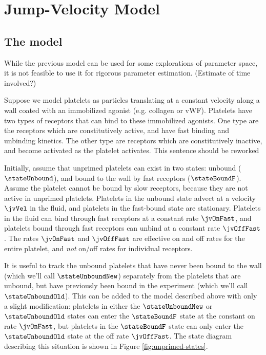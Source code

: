 
\chapter{Jump-Velocity Model}
\label{cha:jump-velocity-model}

\section{The model}
\label{sec:jv-model}

While the previous model can be used for some explorations of
parameter space, it is not feasible to use it for rigorous parameter
estimation. {\color{red} (Estimate of time involved?)}

Suppose we model platelets as particles translating at a constant
velocity along a wall coated with an immobilized agonist
(e.g. collagen or vWF). Platelets have two types of receptors that can
bind to these immobilized agonists. One type are the receptors which
are constitutively active, and have fast binding and unbinding
kinetics. The other type are receptors which are constitutively
inactive, and become activated as the platelet activates. {\color{red}
  This sentence should be reworked}

Initially, assume that unprimed platelets can exist in two states:
unbound ($\stateUnbound$), and bound to the wall by fast receptors
($\stateBoundF$). Assume the platelet cannot be bound by slow
receptors, because they are not active in unprimed
platelets. Platelets in the unbound state advect at a velocity
$\jvVel$ in the fluid, and platelets in the fast-bound state are
stationary. Platelets in the fluid can bind through fast receptors at
a constant rate $\jvOnFast$, and platelets bound through fast
receptors can unbind at a constant rate $\jvOffFast$. The rates
$\jvOnFast$ and $\jvOffFast$ are effective on and off rates for the
entire platelet, and \emph{not} on/off rates for individual receptors.

It is useful to track the unbound platelets that have never been bound
to the wall (which we'll call $\stateUnboundNew$) separately from the
platelets that are unbound, but have previously been bound in the
experiment (which we'll call $\stateUnboundOld$). This can be added to
the model described above with only a slight modification: platelets
in either the $\stateUnboundNew$ or $\stateUnboundOld$ states can enter
the $\stateBoundF$ state at the constant on rate $\jvOnFast$, but
platelets in the $\stateBoundF$ state can only enter the
$\stateUnboundOld$ state at the off rate $\jvOffFast$. The state diagram
describing this situation is shown in Figure
\ref{fig:unprimed-states}.

